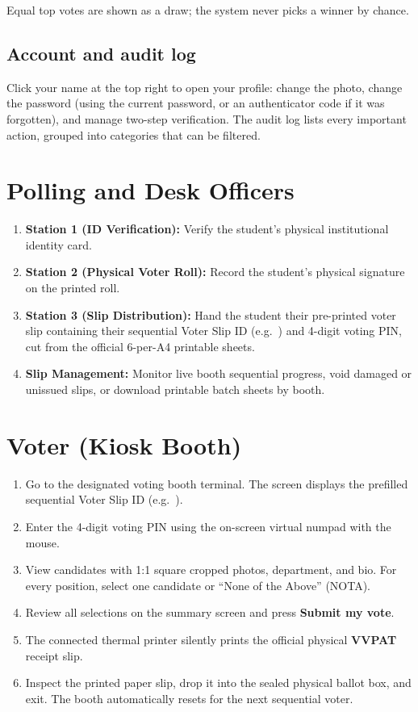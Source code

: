 Equal top votes are shown as a draw; the system never picks a winner by chance.

\subsection{Account and audit log}

Click your name at the top right to open your profile: change the photo, change the password (using the current password, or an authenticator code if it was forgotten), and manage two-step verification. The audit log lists every important action, grouped into categories that can be filtered.

\section{Polling and Desk Officers}

\begin{enumerate}
  \item \textbf{Station 1 (ID Verification):} Verify the student's physical institutional identity card.
  \item \textbf{Station 2 (Physical Voter Roll):} Record the student's physical signature on the printed roll.
  \item \textbf{Station 3 (Slip Distribution):} Hand the student their pre-printed voter slip containing their sequential Voter Slip ID (e.g.\ ) and 4-digit voting PIN, cut from the official 6-per-A4 printable sheets.
  \item \textbf{Slip Management:} Monitor live booth sequential progress, void damaged or unissued slips, or download printable batch sheets by booth.
\end{enumerate}

\section{Voter (Kiosk Booth)}

\begin{enumerate}
  \item Go to the designated voting booth terminal. The screen displays the prefilled sequential Voter Slip ID (e.g.\ ).
  \item Enter the 4-digit voting PIN using the on-screen virtual numpad with the mouse.
  \item View candidates with 1:1 square cropped photos, department, and bio. For every position, select one candidate or ``None of the Above'' (NOTA).
  \item Review all selections on the summary screen and press \textbf{Submit my vote}.
  \item The connected thermal printer silently prints the official physical \textbf{VVPAT} receipt slip.
  \item Inspect the printed paper slip, drop it into the sealed physical ballot box, and exit. The booth automatically resets for the next sequential voter.
\end{enumerate}

